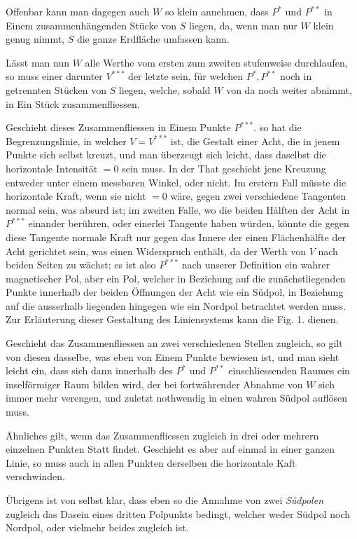 Offenbar kann man dagegen auch $W$ so klein annehmen, dass $P^*$ und $P^{**}$ in Einem zusammenhängenden Stücke von $S$ liegen, da, wenn man nur $W$ klein genug nimmt, $S$ die ganze Erdfläche umfassen kann.

Lässt man nun $W$ alle Werthe vom ersten zum zweiten stufenweise durchlaufen, so muss einer darunter $V^{***}$ der letzte sein, für welchen $P^*,P^{**}$ noch in getrennten Stücken von $S$ liegen, welche, sobald $W$ von da noch weiter abnimmt, in Ein Stück zusammenfliessen.

Geschieht dieses Zusammenfliessen in Einem Punkte $P^{***}$. so hat die Begrenzungslinie, in welcher $V=V^{***}$ ist, die Gestalt einer Acht, die in jenem Punkte sich selbst kreuzt, und man überzeugt sich leicht, dass daselbst die horizontale Intensität $=0$ sein muss. In der That geschieht jene Kreuzung entweder unter einem messbaren Winkel, oder nicht. Im erstern Fall müsste die horizontale Kraft, wenn sie nicht $=0$ wäre, gegen zwei verschiedene Tangenten normal sein, was absurd ist; im zweiten Falle, wo die beiden Hälften der Acht in $P^{***}$ einander berühren, oder einerlei Tangente haben würden, könnte die gegen diese Tangente normale Kraft nur gegen das Innere der einen Flächenhälfte der Acht gerichtet sein, was einen Widerspruch enthält, da der Werth von $V$ nach beiden Seiten zu wächst; es ist also $P^{***}$ nach unserer Definition ein wahrer magnetischer Pol, aber ein Pol, welcher in Beziehung auf die zunächstliegenden Punkte innerhalb der beiden Öffnungen der Acht wie ein Südpol, in Beziehung auf die ausserhalb liegenden hingegen wie ein Nordpol betrachtet werden muss. Zur Erläuterung dieser Gestaltung des Liniensystems kann die Fig. 1. dienen.

Geschieht das Zusammenfliessen an zwei verschiedenen Stellen zugleich, so gilt von diesen dasselbe, was eben von Einem Punkte bewiesen ist, und man sieht leicht ein, dass sich dann innerhalb des $P^*$ und $P^{**}$ einschliessenden Raumes ein inselförmiger Raum bilden wird, der bei fortwährender Abnahme von $W$ sich immer mehr verengen, und zuletzt nothwendig in einen wahren Südpol auflösen muss.

Ähnliches gilt, wenn das Zusammenfliessen zugleich in drei oder mehrern einzelnen Punkten Statt findet. Geschieht es aber auf einmal in einer ganzen Linie, so muss auch in allen Punkten derselben die horizontale Kaft verschwinden.

\par\clearpage
{}
Übrigens ist von selbst klar, dass eben so die Annahme von zwei \textit{Südpolen} zugleich das Dasein eines dritten Polpunkts bedingt, welcher weder Südpol noch Nordpol, oder vielmehr beides zugleich ist.

